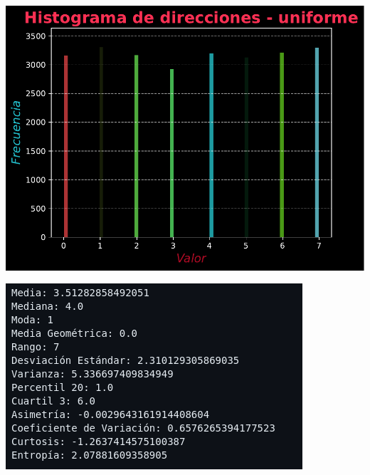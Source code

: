 \documentclass[11pt]{article} %
\begin{document}
	 \begin{multicols}{2}
	 	\begin{minipage}{\linewidth}
	 		\centering
	 		\includegraphics[width=1\linewidth]{hist_direcciones_uniforme.pdf}
	 		\label{fig:direcUnifHist}
	 	\end{minipage}
	 	\vfill\columnbreak
	 	\begin{minipage}{\linewidth}
	 		\centering
	 		\includegraphics[width=1\linewidth]{u1.png}%
	 		\label{direcUnifMet}
	 	\end{minipage}
	 \end{multicols}
	 
\end{document}
